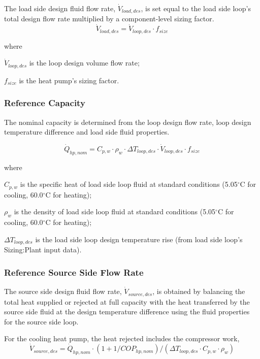 The load side design fluid flow rate, \( \dot V_{load,des} \), is set equal to the load side loop's total design flow rate multiplied by a component-level sizing factor.
\begin{equation}
\dot V_{load,des} = \dot V_{loop,des} \cdot f_{size}
\end{equation}

where

\( \dot V_{loop,des} \) is the loop design volume flow rate;

\( f_{size} \) is the heat pump's sizing factor.

\subsubsection{Reference Capacity}\label{wwhp-ref-capacity}

The nominal capacity is determined from the loop design flow rate, loop design temperature difference and load side fluid properties.

\begin{equation}
\dot Q_{hp,nom} = C_{p,w} \cdot \rho_w \cdot \Delta T_{loop,des} \cdot \dot V_{loop,des} \cdot f_{size}
\end{equation}

where

\( C_{p,w} \) is the specific heat of load side loop fluid at standard conditions (5.05\(^{\circ}\)C for cooling, 60.0\(^{\circ}\)C for heating);

\( \rho_w \) is the density of load side loop fluid at standard conditions (5.05\(^{\circ}\)C for cooling, 60.0\(^{\circ}\)C for heating);

\( \Delta T_{loop,des} \) is the load side loop design temperature rise (from load side loop's Sizing:Plant input data).

\subsubsection{Reference Source Side Flow Rate}\label{WWHP-ref-source-side-flow-rate}

The source side design fluid flow rate, \( \dot V_{source,des} \), is obtained by balancing the total heat supplied or rejected at full capacity with the heat transferred by the source side fluid at the design temperature difference using the fluid properties for the source side loop.

For the cooling heat pump, the heat rejected includes the compressor work,
\begin{equation}
\dot V_{source,des} = \dot Q_{hp,nom} \cdot (1 + 1/COP_{hp,nom})/(\Delta T_{loop,des} \cdot C_{p,w} \cdot \rho_w)
\end{equation}

